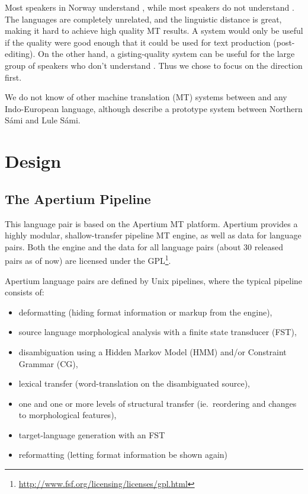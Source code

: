 Most \sme{} speakers in Norway understand \nob{}, while most \nob{}
speakers do not understand \sme{}. The languages are completely
unrelated, and the linguistic distance is great, making it hard to
achieve high quality MT results. A \nobsme{} system would only be useful if the
quality were good enough that it could be used for text production
(post-editing). On the other hand, a \smenob{} gisting-quality system
can be useful for the large group of \nob{} speakers who don't
understand \sme{}. Thus we chose to focus on the \smenob{} direction
first.

We do not know of other machine translation (MT) systems between \sme{}
and any Indo-European language, although \citet{tyers2009dpm} describe
a prototype system between Northern Sámi and Lule Sámi.



\section{Design}
 \label{sec:design}

\subsection{The Apertium Pipeline}
This language pair is based on the Apertium MT
platform\citep{forcada2011afp}. Apertium provides a highly modular,
shallow-transfer pipeline MT engine, as well as data for language
pairs. Both the engine and the data for all language pairs (about 30
released pairs as of now) are licensed under the
GPL\footnote{\href{http://www.fsf.org/licensing/licenses/gpl.html}{http://www.fsf.org/licensing/licenses/gpl.html}}.

Apertium language pairs are defined by Unix pipelines, where the
typical pipeline consists of:

\begin{itemize}
\item deformatting (hiding format information or markup from the
  engine),
\item source language morphological analysis with a finite state
  transducer (FST),
\item disambiguation using a Hidden Markov Model (HMM) and/or
  Constraint Grammar (CG), 
\item lexical transfer (word-translation on the disambiguated source),
\item one and one or more levels of structural transfer
  (ie.~reordering and changes to morphological features), 
\item target-language generation with an FST
\item reformatting (letting format information be shown again)
\end{itemize}

